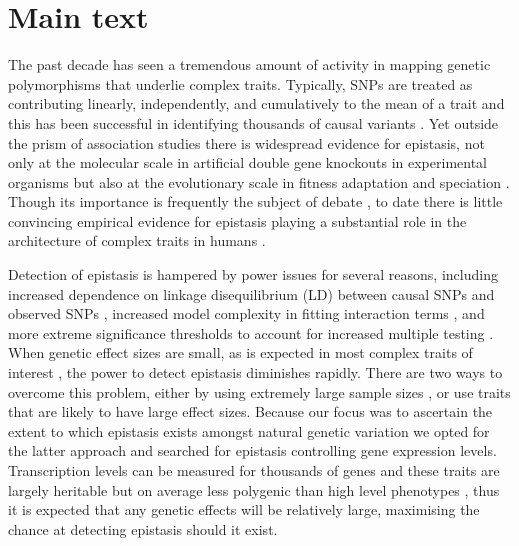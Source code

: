 \documentclass{article}
\begin{document}
\section{Main text}

The past decade has seen a tremendous amount of activity in mapping genetic polymorphisms that underlie complex traits. Typically, SNPs are treated as contributing linearly, independently, and cumulatively to the mean of a trait and this has been successful in identifying thousands of causal variants \cite{Visscher2012}. Yet outside the prism of association studies there is widespread evidence for epistasis, not only at the molecular scale in artificial double gene knockouts in experimental organisms \cite{Costanzo2010} but also at the evolutionary scale in fitness adaptation \cite{Weinreich2006} and speciation \cite{Breen2012}. Though its importance is frequently the subject of debate \cite{Carlborg2004, Hill2008a, Crow2010}, to date there is little convincing empirical evidence for epistasis playing a substantial role in the architecture of complex traits in humans \cite{Strange2010, Evans2011}.

Detection of epistasis is hampered by power issues for several reasons, including increased dependence on linkage disequilibrium (LD) between causal SNPs and observed SNPs \cite{Weir2008, Hemani2013}, increased model complexity in fitting interaction terms \cite{Marchini2005}, and more extreme significance thresholds to account for increased multiple testing \cite{Cordell2009}. When genetic effect sizes are small, as is expected in most complex traits of interest \cite{Visscher2012}, the power to detect epistasis diminishes rapidly. There are two ways to overcome this problem, either by using extremely large sample sizes \cite{LangoAllen2010}, or use traits that are likely to have large effect sizes. Because our focus was to ascertain the extent to which epistasis exists amongst natural genetic variation we opted for the latter approach and searched for epistasis controlling gene expression levels. Transcription levels can be measured for thousands of genes and these traits are largely heritable but on average less polygenic than high level phenotypes \cite{Powell2013}, thus it is expected that any genetic effects will be relatively large, maximising the chance at detecting epistasis should it exist.
\end{document}
